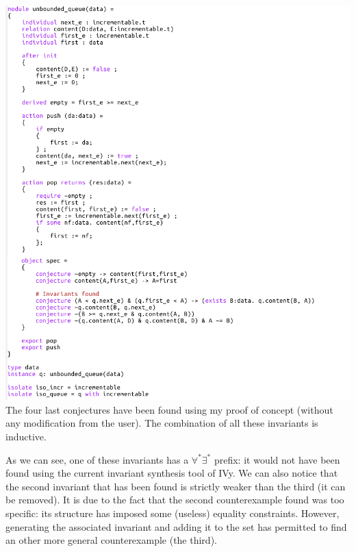 \documentclass[11pt,a4paper,oldfontcommands,openany]{memoir}
\begin{document}
    \includegraphics[width=17cm]{Queue2}\\

    The four last conjectures have been found using my proof of concept (without any modification from the user).
    The combination of all these invariants is inductive.

    As we can see, one of these invariants has a \(\forall^*\exists^*\) prefix: it would not have been found using the current invariant synthesis tool of IVy.
    We can also notice that the second invariant that has been found is strictly weaker than the third (it can be removed).
    It is due to the fact that the second counterexample found was too specific: its structure has imposed some (useless) equality constraints.
    However, generating the associated invariant and adding it to the set has permitted to find an other more general counterexample (the third).
\end{document}
